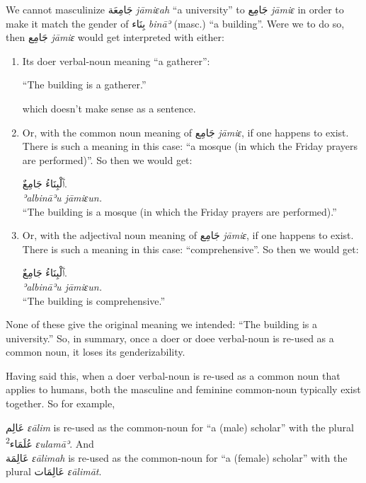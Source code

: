 \documentclass[
  10pt,
]{book}
\begin{document}
We cannot masculinize \foreignlanguage{arabic}{جَامِعَة} \emph{jāmiɛah} \enquote{a university} to \foreignlanguage{arabic}{جَامِع} \emph{jāmiɛ} in order to make it match the gender of \foreignlanguage{arabic}{بِنَاء} \emph{bināʾ} (masc.) \enquote{a building}. Were we to do so, then
\foreignlanguage{arabic}{جَامِع} \emph{jāmiɛ} would get interpreted with either:

\begin{enumerate}
\def\labelenumi{\arabic{enumi}.}
\item
  Its doer verbal-noun meaning \enquote{a gatherer}:

  \enquote{The building is a gatherer.}

  which doesn't make sense as a sentence.
\item
  Or, with the common noun meaning of \foreignlanguage{arabic}{جَامِع} \emph{jāmiɛ}, if one happens to exist. There is such a meaning in this case: \enquote{a mosque (in which the Friday prayers are performed)}. So then we would get:

  \foreignlanguage{arabic}{ٱَلْبِنَاءُ جَامِعٌ.}\\
  \emph{ʾalbināʾu jāmiɛun.}\\
  \enquote{The building is a mosque (in which the Friday prayers are performed).}
\item
  Or, with the adjectival noun meaning of \foreignlanguage{arabic}{جَامِع} \emph{jāmiɛ}, if one happens to exist. There is such a meaning in this case: \enquote{comprehensive}. So then we would get:

  \foreignlanguage{arabic}{ٱَلْبِنَاءُ جَامِعٌ.}\\
  \emph{ʾalbināʾu jāmiɛun.}\\
  \enquote{The building is comprehensive.}
\end{enumerate}

None of these give the original meaning we intended: \enquote{The building is a university.} So, in summary,
once a doer or doee verbal-noun is re-used as a common noun, it loses its genderizability.

Having said this, when a doer verbal-noun is re-used as a common noun that applies to humans, both the masculine and feminine common-noun typically exist together. So for example,

\foreignlanguage{arabic}{عَالِم} \emph{ɛālim} is re-used as the common-noun for \enquote{a (male) scholar} with the plural \textsuperscript{2}\foreignlanguage{arabic}{عُلَمَاء} \emph{ɛulamāʾ}.
And\\
\foreignlanguage{arabic}{عَالِمَة} \emph{ɛālimah} is re-used as the common-noun for \enquote{a (female) scholar} with the plural \foreignlanguage{arabic}{عَالِمَات} \emph{ɛālimāt}.
\end{document}
